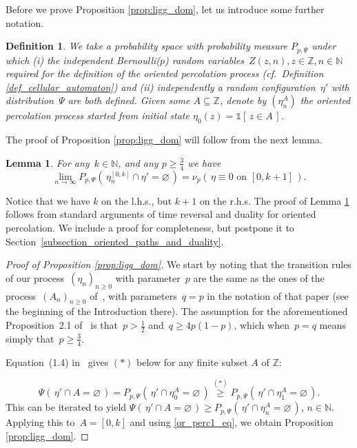 \documentclass[a4paper,12pt]{article}
\newtheorem  {lemma}         [theorem]{Lemma}
\newtheorem  {definition}    [theorem]{Definition}
\begin{document}
Before we prove Proposition \ref{prop:ligg_dom}, let us introduce some further notation.
\begin{definition}\label{def_joint_measure_ori_renew}
We take a probability space with probability measure $P_{p,\Psi}$ under which (i) the independent Bernoulli($p$) random variables~$Z(z,n), z \in \mathbb{Z}, n \in \mathbb{N}$ required for the definition of the oriented percolation process
 (cf.\ Definition \ref{def_cellular_automaton})  and (ii) independently a random configuration~$\eta'$ with distribution~$\Psi$  are both defined.
Given some $A \subseteq \mathbb{Z}$, denote by $(\eta^{A}_n)$ the oriented percolation process started from initial state $\eta_0(z)=\mathds{1}[ \, z \in A  \, ]$.
\end{definition}
The proof of Proposition \ref{prop:ligg_dom} will follow from the next lemma.
\begin{lemma}\label{lem:or_perc1}
	For any~$k \in \mathbb{N}$, and any $p \geq \frac{3}{4}$ we have
	\begin{equation}\label{or_perc1_eq}
\lim_{n \to \infty} P_{p,\Psi}\left(\, \eta^{[0,k]}_n \cap \eta'= \varnothing  \,\right)= \nu_p \left(\,  \eta \equiv 0 \text{ on }  [0,k+1] \, \right).
\end{equation}
\end{lemma}
Notice that we have $k$ on the l.h.s., but $k+1$ on the r.h.s.
The proof of Lemma \ref{lem:or_perc1} follows from standard arguments of time reversal and duality for oriented percolation. We include a proof for completeness, but postpone it to Section~\ref{subsection_oriented_paths_and_duality}.

\begin{proof}[Proof of Proposition \ref{prop:ligg_dom}]
	We start by noting that the transition rules of our process~$(\eta_n)_{n \geq 0}$ with parameter~$p$ are the same as the ones of the process~$(A_n)_{n\geq 0}$ of~\cite{Li95}, with parameters~$q = p$ in the notation of that paper (see the beginning of the Introduction there). The assumption for the aforementioned Proposition~2.1 of~\cite{Li95} is that~$p > \frac12$ and~$q \geq 4p(1-p)$, which when~$p = q$ means simply that~$p \geq \frac34$.
	
\smallskip

	Equation~(1.4) in~\cite{Li95} gives $(*)$ below for any finite subset $A$ of $\mathbb{Z}$:
	
	$$\Psi(\, \eta' \cap A = \varnothing\, )=P_{p,\Psi}(\, \eta' \cap \eta^A_0 = \varnothing\, )  \stackrel{(*)}{\geq} P_{p,\Psi}(\, \eta' \cap \eta^A_1 = \varnothing\, ).
$$
	This can be iterated to yield
	$
	\Psi(\, \eta' \cap A = \varnothing\, )  \geq P_{p,\Psi}(\, \eta' \cap \eta^A_n = \varnothing\, )$,  $n \in \mathbb{N}.
	$
	Applying this to~$A=[0,k]$ and  using \eqref{or_perc1_eq}, we obtain Proposition \ref{prop:ligg_dom}.
\end{proof}
\end{document}
